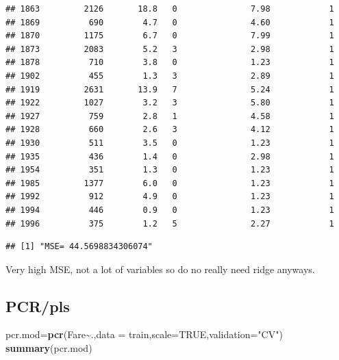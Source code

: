 \documentclass[
]{article}
\newenvironment{Shaded}{\begin{snugshade}}{\end{snugshade}}
\newcommand{\AttributeTok}[1]{\textcolor[rgb]{0.13,0.29,0.53}{#1}}
\newcommand{\ConstantTok}[1]{\textcolor[rgb]{0.56,0.35,0.01}{#1}}
\newcommand{\DecValTok}[1]{\textcolor[rgb]{0.00,0.00,0.81}{#1}}
\newcommand{\FunctionTok}[1]{\textcolor[rgb]{0.13,0.29,0.53}{\textbf{#1}}}
\newcommand{\NormalTok}[1]{#1}
\newcommand{\OtherTok}[1]{\textcolor[rgb]{0.56,0.35,0.01}{#1}}
\newcommand{\SpecialCharTok}[1]{\textcolor[rgb]{0.81,0.36,0.00}{\textbf{#1}}}
\newcommand{\StringTok}[1]{\textcolor[rgb]{0.31,0.60,0.02}{#1}}
\begin{document}
\begin{verbatim}
## 1863         2126       18.8   0               7.98            1
## 1869          690        4.7   0               4.60            1
## 1870         1175        6.7   0               7.99            1
## 1873         2083        5.2   3               2.98            1
## 1878          710        3.8   0               1.23            1
## 1902          455        1.3   3               2.89            1
## 1919         2631       13.9   7               5.24            1
## 1922         1027        3.2   3               5.80            1
## 1927          759        2.8   1               4.58            1
## 1928          660        2.6   3               4.12            1
## 1930          511        3.5   0               1.23            1
## 1935          436        1.4   0               2.98            1
## 1954          351        1.3   0               1.23            1
## 1985         1377        6.0   0               1.23            1
## 1992          912        4.9   0               1.23            1
## 1994          446        0.9   0               1.23            1
## 1996          375        1.2   5               2.27            1
\end{verbatim}

\begin{Shaded}
\end{Shaded}

\begin{verbatim}
## [1] "MSE= 44.5698834306074"
\end{verbatim}

Very high MSE, not a lot of variables so do no really need ridge
anyways.

\subsection{PCR/pls}\label{pcrpls}

\begin{Shaded}
\begin{Highlighting}[]
\NormalTok{pcr.mod}\OtherTok{=}\FunctionTok{pcr}\NormalTok{(Fare}\SpecialCharTok{\textasciitilde{}}\NormalTok{.,}\AttributeTok{data =}\NormalTok{ train,}\AttributeTok{scale=}\ConstantTok{TRUE}\NormalTok{,}\AttributeTok{validation=}\StringTok{"CV"}\NormalTok{)}
\FunctionTok{summary}\NormalTok{(pcr.mod)}
\end{Highlighting}
\end{Shaded}
\end{document}
